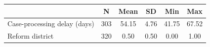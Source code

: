 {
\def\sym#1{\ifmmode^{#1}\else\(^{#1}\)\fi}
\begin{tabular}{l*{1}{ccccc}}
\toprule
                    &           N&        Mean&          SD&         Min&         Max\\
\midrule
Case-processing delay (days)&         303&       54.15&        4.76&       41.75&       67.52\\
Reform district     &         320&        0.50&        0.50&        0.00&        1.00\\
\bottomrule
\end{tabular}
}
